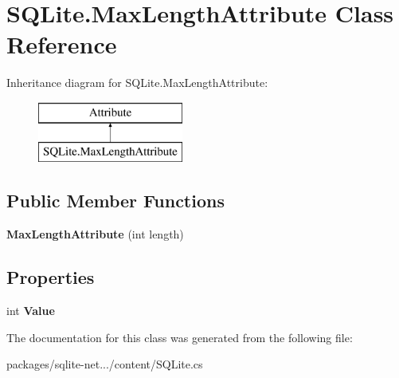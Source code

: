 \hypertarget{classSQLite_1_1MaxLengthAttribute}{}\section{S\+Q\+Lite.\+Max\+Length\+Attribute Class Reference}
\label{classSQLite_1_1MaxLengthAttribute}
Inheritance diagram for S\+Q\+Lite.\+Max\+Length\+Attribute\+:\begin{figure}[H]
\begin{center}
\leavevmode
\includegraphics[height=2.000000cm]{classSQLite_1_1MaxLengthAttribute}
\end{center}
\end{figure}
\subsection*{Public Member Functions}
\begin{DoxyCompactItemize}
\item 
\hypertarget{classSQLite_1_1MaxLengthAttribute_ade550746d23ce2d766d0e1debe57c606}{}{\bfseries Max\+Length\+Attribute} (int length)\label{classSQLite_1_1MaxLengthAttribute_ade550746d23ce2d766d0e1debe57c606}

\end{DoxyCompactItemize}
\subsection*{Properties}
\begin{DoxyCompactItemize}
\item 
\hypertarget{classSQLite_1_1MaxLengthAttribute_afef968d0d949c2f95b78a07975284f5e}{}int {\bfseries Value}\label{classSQLite_1_1MaxLengthAttribute_afef968d0d949c2f95b78a07975284f5e}

\end{DoxyCompactItemize}


The documentation for this class was generated from the following file\+:\begin{DoxyCompactItemize}
\item 
packages/sqlite-\/net.../content/S\+Q\+Lite.\+cs\end{DoxyCompactItemize}
